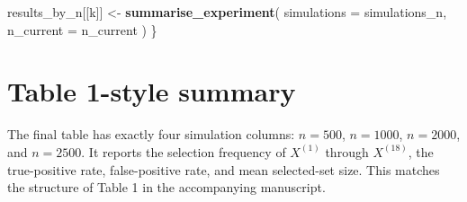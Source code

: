 \documentclass[
]{article}
\newenvironment{Shaded}{\begin{snugshade}}{\end{snugshade}}
\newcommand{\AttributeTok}[1]{\textcolor[rgb]{0.13,0.29,0.53}{#1}}
\newcommand{\FunctionTok}[1]{\textcolor[rgb]{0.13,0.29,0.53}{\textbf{#1}}}
\newcommand{\NormalTok}[1]{#1}
\newcommand{\OtherTok}[1]{\textcolor[rgb]{0.56,0.35,0.01}{#1}}
\begin{document}
\begin{Shaded}
\begin{Highlighting}[]
\NormalTok{  results\_by\_n[[k]] }\OtherTok{\textless{}{-}} \FunctionTok{summarise\_experiment}\NormalTok{(}
    \AttributeTok{simulations =}\NormalTok{ simulations\_n,}
    \AttributeTok{n\_current =}\NormalTok{ n\_current}
\NormalTok{  )}
\NormalTok{\}}
\end{Highlighting}
\end{Shaded}

\section{Table 1-style summary}\label{table-1-style-summary}

The final table has exactly four simulation columns: \(n=500\),
\(n=1000\), \(n=2000\), and \(n=2500\). It reports the selection
frequency of \(X^{(1)}\) through \(X^{(18)}\), the true-positive rate,
false-positive rate, and mean selected-set size. This matches the
structure of Table 1 in the accompanying manuscript.
\end{document}
